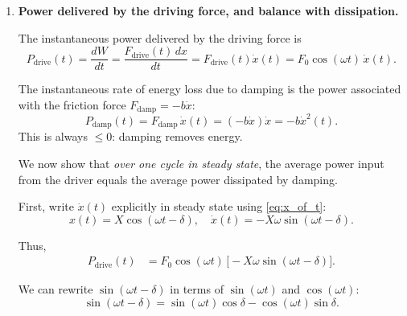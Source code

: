 \documentclass[../main.tex]{subfiles}
\begin{document}
\begin{enumerate}
At $\omega = \omega_0$, \eqref{eq:avgE_simplified} gives
\[
\langle E \rangle_{\omega=\omega_0}
= \frac{m X_\text{res}^2}{4} (\omega_0^2 + \omega_0^2)
= \frac{m X_\text{res}^2}{4} (2\omega_0^2)
= \frac{m \omega_0^2 X_\text{res}^2}{2}.
\]

Insert $X_\text{res}$:
\[
\langle E \rangle_{\omega=\omega_0}
= \frac{m \omega_0^2}{2}
\left(\frac{F_0}{2 m \gamma \omega_0}\right)^2
= \frac{m \omega_0^2}{2}
\frac{F_0^2}{4 m^2 \gamma^2 \omega_0^2}
= \frac{F_0^2}{8 m \gamma^2}.
\]

So, at resonance,
\begin{equation}
\boxed{
\langle E \rangle_{\omega=\omega_0}
= \frac{F_0^2}{8 m \gamma^2}
= \frac{F_0^2}{8 m} \left(\frac{2m}{b}\right)^2
= \frac{F_0^2 m}{2 b^2}.
}
\end{equation}

This shows that the average stored mechanical energy at resonance grows as damping becomes smaller (since $\gamma = b/(2m)$).


\item \textbf{Power delivered by the driving force, and balance with dissipation.}

The instantaneous power delivered by the driving force is
\[
P_\text{drive}(t) = \frac{dW}{dt}=\frac{F_\text{drive}(t)\,dx }{dt} = F_\text{drive}(t)\dot{x}(t)
= F_0 \cos(\omega t)\, \dot{x}(t).
\]

The instantaneous rate of energy loss due to damping is the power associated with the friction force $F_\text{damp} = -b \dot{x}$:
\[
P_\text{damp}(t) = F_\text{damp} \, \dot{x}(t)
= (-b \dot{x}) \dot{x}
= - b \dot{x}^2(t).
\]
This is always $\le 0$: damping removes energy.

We now show that \emph{over one cycle in steady state}, the average power input from the driver equals the average power dissipated by damping.

First, write $\dot{x}(t)$ explicitly in steady state using \eqref{eq:x_of_t}:
\[
x(t) = X \cos(\omega t - \delta),
\quad
\dot{x}(t) = -X \omega \sin(\omega t - \delta).
\]

Thus,
\begin{align}
P_\text{drive}(t)
&= F_0 \cos(\omega t)\, \big[-X \omega \sin(\omega t - \delta)\big].
\end{align}

We can rewrite $\sin(\omega t - \delta)$ in terms of $\sin(\omega t)$ and $\cos(\omega t)$:
\[
\sin(\omega t - \delta)
= \sin(\omega t)\cos\delta - \cos(\omega t)\sin\delta.
\]


\end{enumerate}
\end{document}
